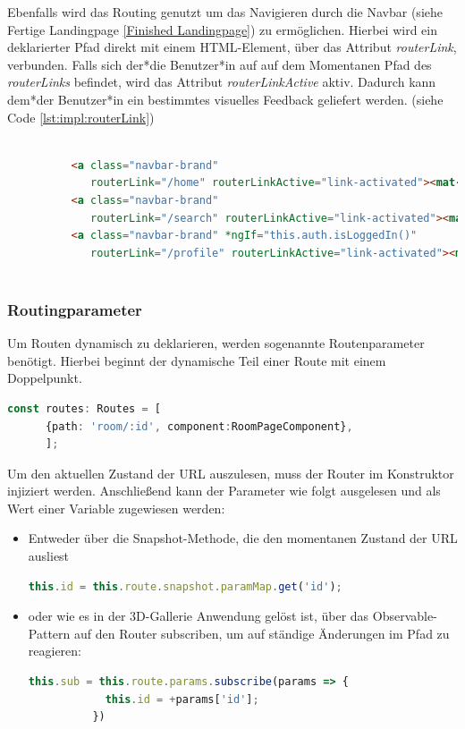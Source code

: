 Ebenfalls wird das Routing genutzt um das Navigieren durch die Navbar (siehe Fertige Landingpage \ref{Finished Landingpage}) zu ermöglichen. Hierbei wird ein deklarierter Pfad direkt mit einem HTML-Element, über das Attribut \emph{routerLink}, verbunden. Falls sich der*die Benutzer*in auf auf dem Momentanen Pfad des \emph{routerLinks} befindet, wird das Attribut \emph{routerLinkActive} aktiv. Dadurch kann dem*der Benutzer*in ein bestimmtes visuelles Feedback geliefert werden.  (siehe Code \ref{lst:impl:routerLink})

\begin{lstlisting}[caption={Routing über einen routerLink},language=HTML,label=lst:impl:routerLink]
    
          <a class="navbar-brand"
             routerLink="/home" routerLinkActive="link-activated"><mat-icon>home</mat-icon>Home</a>
          <a class="navbar-brand"
             routerLink="/search" routerLinkActive="link-activated"><mat-icon>search</mat-icon>Search</a>
          <a class="navbar-brand" *ngIf="this.auth.isLoggedIn()"
             routerLink="/profile" routerLinkActive="link-activated"><mat-icon>person</mat-icon>Profile</a>
       
\end{lstlisting}

\subsubsection{Routingparameter}
\label{Routingparameter}
Um Routen dynamisch zu deklarieren, werden sogenannte Routenparameter benötigt. Hierbei beginnt der dynamische Teil einer Route mit einem Doppelpunkt. 


\begin{lstlisting}[caption={Routingparamter in der 3D-Gallery},language=TypeScript,label=lst:impl:routingparameter]
    const routes: Routes = [
      {path: 'room/:id', component:RoomPageComponent},
      ];    
\end{lstlisting}

Um den aktuellen Zustand der URL auszulesen, muss der Router im Konstruktor injiziert werden. Anschließend kann der Parameter wie folgt ausgelesen und als Wert einer Variable zugewiesen werden:

\begin{itemize}
    \item Entweder über die Snapshot-Methode, die den momentanen Zustand der URL ausliest 
    \begin{lstlisting}[caption={Snapshot der URL abfragen},language=TypeScript,label=lst:impl:routingsnapshot]
        this.id = this.route.snapshot.paramMap.get('id');
    \end{lstlisting}
    \item oder wie es in der 3D-Gallerie Anwendung gelöst ist, über das Observable-Pattern auf den Router subscriben, um auf ständige Änderungen im Pfad zu reagieren:
    \begin{lstlisting}[caption={Die URL subscriben},language=TypeScript,label=lst:impl:urlsubscription]
        this.sub = this.route.params.subscribe(params => {
            this.id = +params['id'];
          })
    \end{lstlisting}
\end{itemize}
\cite{AngularBuch}